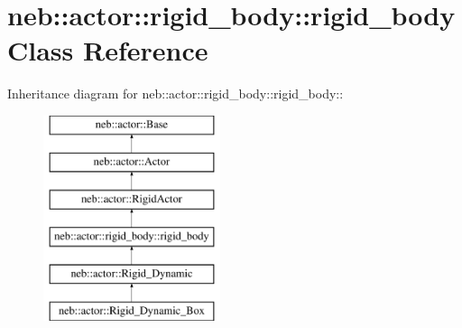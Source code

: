 \hypertarget{classneb_1_1actor_1_1rigid__body_1_1rigid__body}{
\section{neb::actor::rigid\_\-body::rigid\_\-body Class Reference}
\label{classneb_1_1actor_1_1rigid__body_1_1rigid__body}
}
Inheritance diagram for neb::actor::rigid\_\-body::rigid\_\-body::\begin{figure}[H]
\begin{center}
\leavevmode
\includegraphics[height=6cm]{classneb_1_1actor_1_1rigid__body_1_1rigid__body}
\end{center}
\end{figure}
